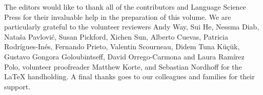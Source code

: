 \addchap{\lsAcknowledgementTitle} 
The editors would like to thank all of the contributors and Language Science Press for their invaluable help in the preparation of this volume. We are particularly grateful to the volunteer reviewers Andy Way, Sui He, Nessma Diab, ‪Nataša Pavlović‬, Susan Pickford, Xichen Sun, Alberto Cuevas, Patricia Rodrígues-Inés, Fernando Prieto, Valentin Scourneau, Didem Tuna Küçük, Gustavo Gongora Goloubintseff, David Orrego-Carmona and Laura Ramírez Polo, volunteer proofreader Matthew Korte, and Sebastian Nordhoff for the LaTeX handholding. 
A final thanks goes to our colleagues and families for their support.